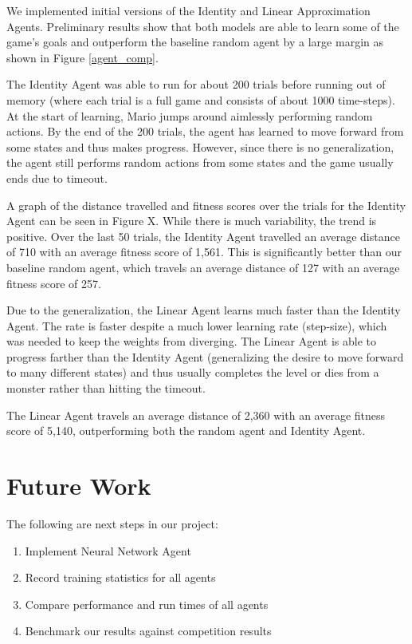 \documentclass[12pt]{article}
\begin{document}
We implemented initial versions of the Identity and Linear Approximation Agents. Preliminary results show that both models are able to learn some of the game's goals and outperform the baseline random agent by a large margin as shown in Figure \ref{agent_comp}.

The Identity Agent was able to run for about 200 trials before running out of memory (where each trial is a full game and consists of about 1000 time-steps). At the start of learning, Mario jumps around aimlessly performing random actions. By the end of the 200 trials, the agent has learned to move forward from some states and thus makes progress. However, since there is no generalization, the agent still performs random actions from some states and the game usually ends due to timeout. 

A graph of the distance travelled and fitness scores over the trials for the Identity Agent can be seen in Figure X. While there is much variability, the trend is positive. Over the last 50 trials, the Identity Agent travelled an average distance of 710 with an average fitness score of 1,561. This is significantly better than our baseline random agent, which travels an average distance of 127 with an average fitness score of 257.

Due to the generalization, the Linear Agent learns much faster than the Identity Agent. The rate is faster despite a much lower learning rate (step-size), which was needed to keep the weights from diverging. The Linear Agent is able to progress farther than the Identity Agent (generalizing the desire to move forward to many different states) and thus usually completes the level or dies from a monster rather than hitting the timeout. 

The Linear Agent travels an average distance of 2,360 with an average fitness score of 5,140, outperforming both the random agent and Identity Agent.

\section{Future Work}

The following are next steps in our project:

\begin{enumerate}
\item Implement Neural Network Agent
\item Record training statistics for all agents
\item Compare performance and run times of all agents
\item Benchmark our results against competition results
\end{enumerate}
\end{document}
